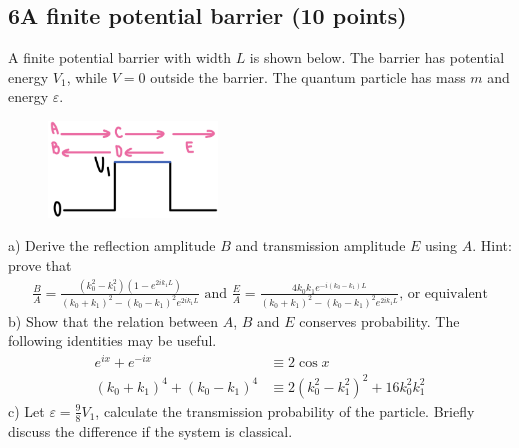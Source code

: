 \documentclass[12pt]{book} %
\numberwithin{equation}{chapter}
\def\e{\varepsilon}
\def\lq{\hspace{2.5ex}}
\begin{document}
\subsection*{6\lq A finite potential barrier (10 points)}
A finite potential barrier with width $L$ is shown below. The barrier has potential energy $V_{1}$, while $V=0$ outside the barrier. The quantum particle has mass $m$ and energy $\e$.
\begin{figure}[H]
\centering
\includegraphics[width=0.4\textwidth]{A finite potential barrier}
\end{figure}

\noindent a) Derive the reflection amplitude $B$ and transmission amplitude $E$ using $A$.\bigskip\newline
Hint: prove that
\begin{align*}
\frac{B}{A}=\frac{\left(k_{0}^{2}-k_{1}^{2}\right)\left(1-e^{2ik_{1}L}\right)}{\left(k_{0}+k_{1}\right)^{2}-\left(k_{0}-k_{1}\right)^{2}e^{2ik_{1}L}}\text{ and }\frac{E}{A}=\frac{4k_{0}k_{1}e^{-i\left(k_{0}-k_{1}\right)L}}{\left(k_{0}+k_{1}\right)^{2}-\left(k_{0}-k_{1}\right)^{2}e^{2ik_{1}L}}\text{, or equivalent}
\end{align*}
b) Show that the relation between $A$, $B$ and $E$ conserves probability. The following identities may be useful.
\begin{align*}
e^{ix}+e^{-ix}&\equiv2\cos x\\
\left(k_{0}+k_{1}\right)^{4}+\left(k_{0}-k_{1}\right)^{4}&\equiv2\left(k_{0}^{2}-k_{1}^{2}\right)^{2}+16k_{0}^{2}k_{1}^{2}
\end{align*}
c) Let $\e=\frac{9}{8}V_{1}$, calculate the transmission probability of the particle. Briefly discuss the difference if the system is classical.
\end{document}
